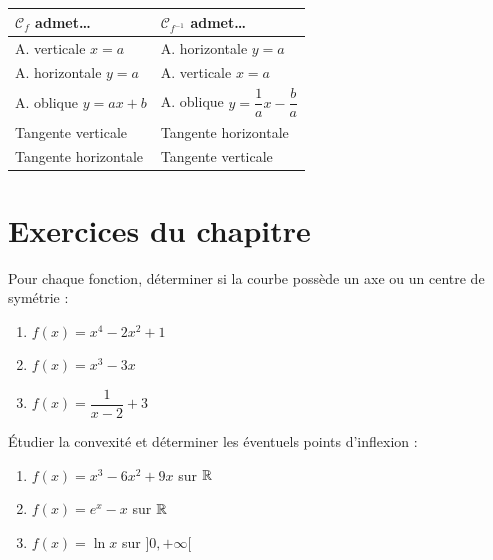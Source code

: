 \begin{propriete}
  \begin{center}
  \renewcommand{\arraystretch}{1.8}
  \begin{tabular}{|p{5.5cm}|p{5.5cm}|}
    \hline
    \textbf{\color{navy}$\mathcal{C}_f$ admet\ldots}
      & \textbf{\color{navy}$\mathcal{C}_{f^{-1}}$ admet\ldots} \\
    \hline\hline
    A. verticale $x = a$     & A. horizontale $y = a$ \\
    \hline
    A. horizontale $y = a$   & A. verticale $x = a$ \\
    \hline
    A. oblique $y = ax + b$  & A. oblique $y = \dfrac{1}{a}x - \dfrac{b}{a}$ \\
    \hline
    Tangente verticale       & Tangente horizontale \\
    \hline
    Tangente horizontale     & Tangente verticale \\
    \hline
  \end{tabular}
  \end{center}
\end{propriete}

\newpage
\section*{Exercices du chapitre}

\begin{exercice}
  Pour chaque fonction, d\'{e}terminer si la courbe poss\`{e}de
  un axe ou un centre de sym\'{e}trie :
  \begin{enumerate}
    \item $f(x) = x^4 - 2x^2 + 1$
    \item $f(x) = x^3 - 3x$
    \item $f(x) = \dfrac{1}{x-2} + 3$
  \end{enumerate}
\end{exercice}

\begin{exercice}
  \'{E}tudier la convexit\'{e} et d\'{e}terminer les \'{e}ventuels points d'inflexion :
  \begin{enumerate}
    \item $f(x) = x^3 - 6x^2 + 9x$ sur $\mathbb{R}$
    \item $f(x) = e^x - x$ sur $\mathbb{R}$
    \item $f(x) = \ln x$ sur $]0,+\infty[$
  \end{enumerate}
\end{exercice}

